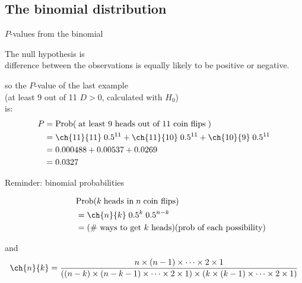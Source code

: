\subsection{The binomial distribution}

\begin{frame}{$P$-values from the binomial}

  The null hypothesis is \\
  \hspace{2em}  difference between the observations is equally likely to be positive or negative.

    \vspace{2em}

    so the $P$-value of the last example \\
    (at least 9 out of 11 $D>0$, calculated with $H_0$) \\
    is:
    \begin{align*} 
      P &= \mbox{Prob}( \; \text{at least 9 heads out of 11 coin flips}\; ) \\
       &= 
         \ch{11}{11} \; 0.5^{11} + 
         \ch{11}{10} \; 0.5^{11} + 
         \ch{10}{9} \; 0.5^{11} \\
       &= 
       0.000488 + 0.00537 + 0.0269  \\
       &= 0.0327
     \end{align*}

\end{frame}

\begin{frame}{Reminder: binomial probabilities}

  \begin{align*}
    &\mbox{Prob}( k \; \text{heads in} \; n \; \text{coin flips} ) \\
    \qquad \qquad &= \ch{n}{k} \; 0.5^k \; 0.5^{n-k} \\
    \qquad \qquad &= \text{(\# ways to get $k$ heads)} \text{(prob of each possibility)}
  \end{align*}

  \vspace{2em}
  and
  \[
  \ch{n}{k} = \frac{ n \times (n-1) \times \cdots \times 2 \times 1 }{ ( (n-k) \times (n-k-1) \times \cdots \times 2 \times 1) \times ( k \times (k-1) \times \cdots \times 2 \times 1) }
  \]


\end{frame}


